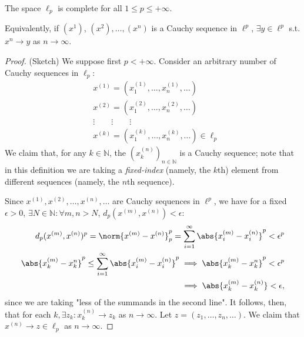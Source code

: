 \begin{theorem}
    The space $\ell_p$ is complete for all $1 \leq p \leq + \infty$. 

    Equivalently, if $(x^1)$, $(x^2), \dots, (x^n)$ is a Cauchy sequence in $\ell^p$, $\exists y \in \ell^p$ s.t. $x^n \to y$ as $n \to \infty$.
\end{theorem}

\begin{proof}(Sketch)
    We suppose first $p < +\infty$. Consider an arbitrary number of Cauchy sequences in $\ell_p$: \begin{align*}
        &x^{(1)} = (x_1^{(1)}, \dots, x_n^{(1)}, \dots) \\
        &x^{(2)} = (x_1^{(2)}, \dots, x_n^{(2)}, \dots)\\
        &\vdots \qquad \vdots \qquad \vdots\\
        &x^{(k)} = (x_1^{(k)}, \dots, x_n^{(k)}, \dots) \in \ell_p
    \end{align*} We claim that, for any $k \in \mathbb{N}$, the $(x_k^{(n)})_{n \in \mathbb{N}}$ is a Cauchy sequence; note that in this definition we are taking a \emph{fixed-index} (namely, the $k$th) element from different sequences (namely, the $n$th sequence).

    Since $x^{(1)}, x^{(2)}, \dots, x^{(n)}, \dots$ are Cauchy sequences in $\ell^p$, we have for a fixed $\epsilon > 0$, $\exists N \in \mathbb{N} : \forall m, n > N$, $d_p(x^{(m)}, x^{(n)}) < \epsilon$:
    \begin{align*}
        d_p(x^{(m)}, x^{(n)})^p = \norm{x^{(m)} - x^{(n)}}_p^p = \sum_{i=1}^\infty \abs{x_i^{(m)} - x_i^{(n)}}^p < \epsilon^p\\
        \abs{x_k^{(m)} - x_k^{n}}^p \leq \sum_{i=1}^\infty \abs{x_i^{(m)} - x_i^{(n)}}^p  \implies \abs{x_k^{(m)} - x_k^{n}}^p < \epsilon^p \\
        \implies \abs{x_k^{(m)} - x_{k}^{(n)}} < \epsilon,
    \end{align*}
    since we are taking "less of the summands in the second line". It follows, then, that for each $k, \exists z_k : x_k^{(n)} \to z_k$ as $n \to \infty$. Let $z = (z_1, \dots, z_n, \dots)$. We claim that $x^{(n)} \to z \in \ell_p$ as $n \to \infty$. 


\end{proof}
